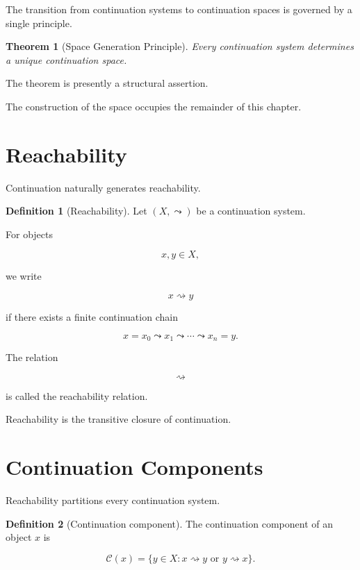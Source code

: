 \documentclass[13pt,openany]{book}
\theoremstyle{plain}
\newtheorem{theorem}{Theorem}[chapter]
\theoremstyle{definition}
\newtheorem{definition}{Definition}[chapter]
\begin{document}
The transition from continuation systems to continuation spaces is governed by a
single principle.

\begin{theorem}[Space Generation Principle]

Every continuation system determines a unique continuation space.

\end{theorem}

The theorem is presently a structural assertion.

The construction of the space occupies the remainder of this chapter.


\section{Reachability}

Continuation naturally generates reachability.

\begin{definition}[Reachability]

Let $(X,\leadsto)$ be a continuation system.

For objects

\[
x,y\in X,
\]

we write

\[
x\rightsquigarrow y
\]

if there exists a finite continuation chain

\[
x=x_0
\leadsto
x_1
\leadsto
\cdots
\leadsto
x_n=y.
\]

The relation

\[
\rightsquigarrow
\]

is called the reachability relation.

\end{definition}

Reachability is the transitive closure of continuation.


\section{Continuation Components}

Reachability partitions every continuation system.

\begin{definition}[Continuation component]

The continuation component of an object $x$ is

\[
\mathcal C(x)
=
\{
y\in X:
x\rightsquigarrow y
\text{ or }
y\rightsquigarrow x
\}.
\]

\end{definition}
\end{document}
